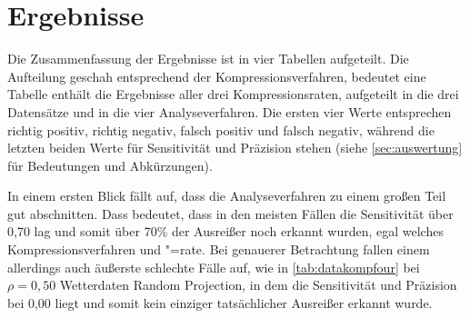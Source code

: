 \section{Ergebnisse}
Die Zusammenfassung der Ergebnisse ist in vier Tabellen aufgeteilt. Die Aufteilung geschah entsprechend der Kompressionsverfahren, bedeutet eine Tabelle enthält die Ergebnisse aller drei Kompressionsraten, aufgeteilt in die drei Datensätze und in die vier Analyseverfahren. Die ersten vier Werte entsprechen richtig positiv, richtig negativ, falsch positiv und falsch negativ, während die letzten beiden Werte für Sensitivität und Präzision stehen (siehe \autoref{sec:auswertung} für Bedeutungen und Abkürzungen).

In einem ersten Blick fällt auf, dass die Analyseverfahren zu einem großen Teil gut abschnitten. Dass bedeutet, dass in den meisten Fällen die Sensitivität über 0,70 lag und somit über 70\% der Ausreißer noch erkannt wurden, egal welches Kompressionsverfahren und "=rate. Bei genauerer Betrachtung fallen einem allerdings auch äußerste schlechte Fälle auf, wie in \autoref{tab:datakompfour} bei $\rho=0,50$ Wetterdaten Random Projection, in dem die Sensitivität und Präzision bei 0,00 liegt und somit kein einziger tatsächlicher Ausreißer erkannt wurde.
